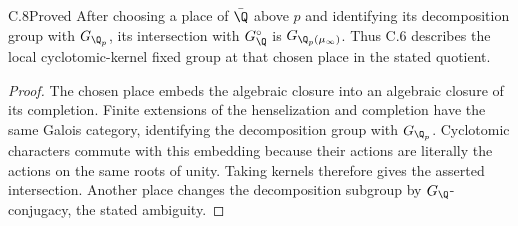 \begin{claim}{C.8}{Proved}
After choosing a place of $\bar\Q$ above $p$ and identifying its decomposition
group with $G_{\Q_p}$, its intersection with $G_\Q^\circ$ is
$G_{\Q_p(\mu_\infty)}$. Thus C.6 describes the local cyclotomic-kernel fixed
group at that chosen place in the stated quotient.
\end{claim}
\begin{proof}
The chosen place embeds the algebraic closure into an algebraic closure of
its completion. Finite extensions of the henselization and completion
have the same Galois category, identifying the decomposition group with
$G_{\Q_p}$. Cyclotomic characters commute with this embedding because
their actions are literally the actions on the same roots of unity.
Taking kernels therefore gives the asserted intersection. Another place
changes the decomposition subgroup by $G_\Q$-conjugacy, the stated ambiguity.
\end{proof}

